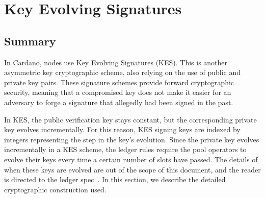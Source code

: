 \section{Key Evolving Signatures}
\label{sec:kes}
\subsection{Summary}
In Cardano, nodes use Key Evolving Signatures (KES).
This is another asymmetric key cryptographic scheme, also relying on
the use of public and private key pairs.
These signature schemes provide forward cryptographic security, meaning that a
compromised key does not make it easier for an adversary to forge a signature that
allegedly had been signed in the past.

In KES, the public verification key stays constant, but the
corresponding private key evolves incrementally. For this reason, KES
signing keys are indexed by integers representing the step in the key's
evolution. Since the private key evolves incrementally in a KES scheme, the ledger rules
require the pool operators to evolve their keys every time a certain number of
slots have passed. The details of when these keys are evolved are out of the 
scope of this document, and the reader is directed to the ledger spec~\cite{ledgerspec}.
In this section, we describe the detailed cryptographic construction used. 

